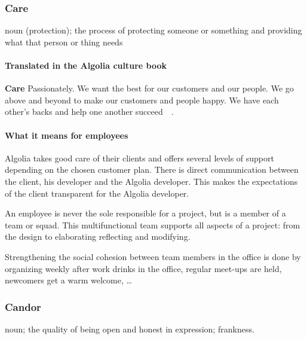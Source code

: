 \subsubsection{Care}
\label{ssub:care}

\begin{definition}
noun (protection); the process of protecting someone or something and providing what that person or thing needs
\end{definition}


\paragraph{Translated in the Algolia culture book}

\textbf{Care} Passionately. We want the best for our customers and our people. We go above and beyond to make our customers and people happy. We have each other's backs and help one another succeed~\cite{algolia-careers}~.

\paragraph{What it means for employees} 

Algolia takes good care of their clients and offers several levels of support depending on the chosen customer plan. There is direct communication between the client, his developer and the Algolia developer. This makes the expectations of the client transparent for the Algolia developer.

An employee is never the sole responsible for a project, but is a member of a team or squad. This multifunctional team supports all aspects of a project: from the design to elaborating reflecting and modifying.

Strengthening the social cohesion between team members in the office is done by organizing weekly after work drinks in the office, regular meet-ups are held, newcomers get a warm welcome, \dots

\subsubsection{Candor}
\label{ssub:candor}

\begin{definition}
noun; the quality of being open and honest in expression; frankness.
\end{definition}

